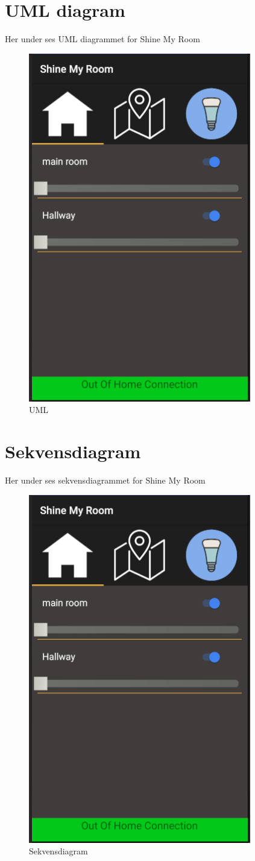 \section{UML diagram}
Her under ses UML diagrammet for Shine My Room
\begin{figure}[H]
	\centering
	\includegraphics[width=0.5\linewidth, height=0.7\linewidth]{Design/Startscreen}
	\caption{UML}
	\label{fig:UML Diagram}
\end{figure}

\section{Sekvensdiagram}
Her under ses sekvensdiagrammet for Shine My Room
\begin{figure}[H]
	\centering
	\includegraphics[width=0.5\linewidth, height=0.7\linewidth]{Design/Startscreen}
	\caption{Sekvensdiagram}
	\label{fig:Sekvensdiagram}
\end{figure}